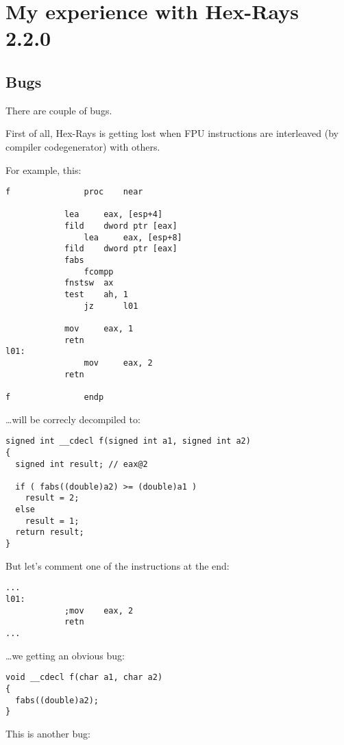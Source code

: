 \section{My experience with Hex-Rays 2.2.0}
\label{hex_rays}

\subsection{Bugs}

There are couple of bugs.

First of all, Hex-Rays is getting lost when \ac{FPU} instructions are interleaved (by compiler codegenerator) with others.

For example, this:

\begin{lstlisting}
f               proc    near

        	lea     eax, [esp+4]
	        fild    dword ptr [eax]
                lea     eax, [esp+8]
        	fild    dword ptr [eax]
	        fabs
                fcompp
        	fnstsw  ax
	        test    ah, 1
                jz      l01

        	mov     eax, 1
	        retn
l01:
                mov     eax, 2
	        retn

f               endp
\end{lstlisting}

\dots will be correcly decompiled to:

\begin{lstlisting}
signed int __cdecl f(signed int a1, signed int a2)
{
  signed int result; // eax@2

  if ( fabs((double)a2) >= (double)a1 )
    result = 2;
  else
    result = 1;
  return result;
}
\end{lstlisting}

But let's comment one of the instructions at the end:

\begin{lstlisting}
...
l01:
	        ;mov    eax, 2
        	retn
...
\end{lstlisting}

\dots we getting an obvious bug:

\begin{lstlisting}
void __cdecl f(char a1, char a2)
{
  fabs((double)a2);
}
\end{lstlisting}

This is another bug:

